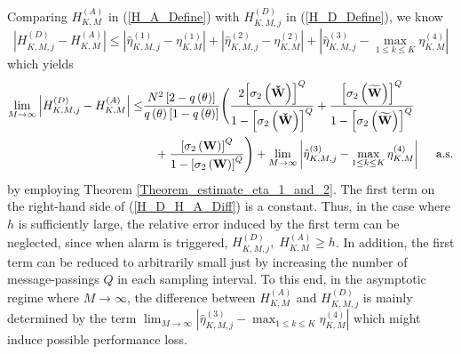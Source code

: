 \documentclass[11pt, draftclsnofoot, onecolumn]{IEEEtran}
\newcommand{\cW}{{\check{W}}}
\newcommand{\tW}{{\widetilde{W}}}
\begin{document}
Comparing $H_{K,M}^{\left( A \right)}$ in (\ref{H_A_Define}) with $H_{K,M,j}^{\left( D \right)}$ in (\ref{H_D_Define}), we know
\begin{equation}
\left| {H_{K,M,j}^{\left( D \right)} - H_{K,M}^{\left( A \right)}} \right| \le \left| {\hat \eta _{K,M,j}^{(1)} - \eta _{K,M}^{(1)}} \right| + \left| {\hat \eta _{K,M,j}^{(2)} - \eta _{K,M}^{(2)}} \right| + \left| {\hat \eta _{K,M,j}^{(3)} - \mathop {\max }\limits_{1 \le k \le K} \eta _{K,M}^{(4)}} \right|
\end{equation}
which yields
\begin{align} \notag
\mathop {\lim }\limits_{M \to \infty } \left| {H_{K,M,j}^{\left( D \right)} - H_{K,M}^{\left( A \right)}} \right| \le & \frac{ {N^2} \left[{2 - q\left( \theta  \right)} \right] }{{q\left( \theta  \right)\left[ {1 - q\left( \theta  \right)} \right]}} \Bigg(  \frac{{2{{\left[ {{\sigma _2}\left( {\bf{\cW}} \right)} \right]}^Q}}}{{1 - {{\left[ {{\sigma _2}\left( {\bf{\cW}} \right)} \right]}^Q}}}  + \frac{{{{\left[ {{\sigma _2}\left( {\bf{\tW}} \right)} \right]}^Q}}}{{1 - {{\left[ {{\sigma _2}\left( {\bf{\tW}} \right)} \right]}^Q}}} \\   \label{H_D_H_A_Diff}
&  \quad  + \frac{{{{\left[ {{\sigma _2}\left( {\bf{W}} \right)} \right]}^Q}}}{{1 - {{\left[ {{\sigma _2}\left( {\bf{W}} \right)} \right]}^Q}}}\Bigg)   + \mathop {\lim }\limits_{M \to \infty } \left| {\hat \eta _{K,M,j}^{(3)} - \mathop {\max }\limits_{1 \le k \le K} \eta _{K,M}^{(4)}} \right| \quad \text{ a.s.}
\end{align}
by employing Theorem \ref{Theorem_estimate_eta_1_and_2}. The first term on the right-hand side of (\ref{H_D_H_A_Diff}) is a constant. Thus, in the case where $h$ is sufficiently large, the relative error induced by the first term can be neglected, since when alarm is triggered, ${H_{K,M,j}^{\left( D \right)}, \; H_{K,M}^{\left( A \right)}} \ge h$. In addition, the first term can be reduced to arbitrarily small just by increasing the number of message-passings $Q$ in each sampling interval. To this end, 
in the asymptotic regime where $M \to \infty$, the difference between $H_{K,M}^{\left( A \right)}$ and $H_{K,M,j}^{\left( D \right)}$ is mainly determined by the term ${\lim }_{M \to \infty } | {\hat \eta _{K,M,j}^{(3)} -  {\max }_{1 \le k \le K} \eta _{K,M}^{(4)}} |$ which might induce possible performance loss.
\end{document}
